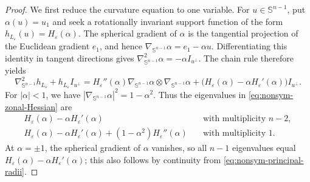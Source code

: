 \documentclass[11pt]{article}
\theoremstyle{remark}
\newcommand{\Sph}{\mathbb{S}}
\begin{document}
\begin{proof}
We first reduce the curvature equation to one variable.  For
$u\in\Sph^{n-1}$, put $\alpha(u)=u_1$ and seek a rotationally invariant
support function of the form
$h_{L_\varepsilon}(u)=H_\varepsilon(\alpha)$.  The spherical gradient of
$\alpha$ is the tangential projection of the Euclidean gradient $e_1$, and
hence
$
 \nabla_{\Sph^{n-1}}\alpha=e_1-\alpha u.
$
Differentiating this identity in tangent directions gives
$
 \nabla_{\Sph^{n-1}}^2\alpha=-\alpha I_{u^\perp}.
$ 
The chain rule therefore yields
\begin{equation}\label{eq:nonsym-zonal-Hessian}
 \nabla_{\Sph^{n-1}}^2h_{L_\varepsilon}
 +h_{L_\varepsilon}I_{u^\perp}
 =H_\varepsilon''(\alpha)
   \nabla_{\Sph^{n-1}}\alpha\otimes
   \nabla_{\Sph^{n-1}}\alpha
  +\bigl(H_\varepsilon(\alpha)-\alpha H_\varepsilon'(\alpha)\bigr)
   I_{u^\perp}.
\end{equation}
For $|\alpha|<1$, we have
$|\nabla_{\Sph^{n-1}}\alpha|^2=1-\alpha^2$.  Thus the eigenvalues in
\eqref{eq:nonsym-zonal-Hessian} are
\begin{equation}\label{eq:nonsym-principal-radii}
 \begin{aligned}
 H_\varepsilon(\alpha)-\alpha H_\varepsilon'(\alpha)\quad
 &\text{with multiplicity }n-2,\\
 H_\varepsilon(\alpha)-\alpha H_\varepsilon'(\alpha)
 +(1-\alpha^2)H_\varepsilon''(\alpha)\quad
 &\text{with multiplicity }1.
 \end{aligned}
\end{equation}
At $\alpha=\pm1$, the spherical gradient of $\alpha$ vanishes, so all $n-1$
eigenvalues equal
$H_\varepsilon(\alpha)-\alpha H_\varepsilon'(\alpha)$; this also follows by
continuity from \eqref{eq:nonsym-principal-radii}.


\end{proof}
\end{document}
